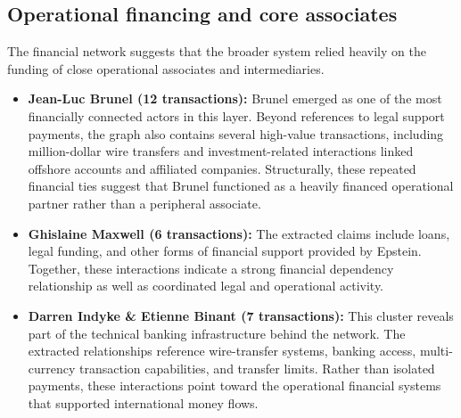 \subsection{Operational financing and core associates}
The financial network suggests that the broader system relied heavily on the funding of close operational associates and intermediaries.
\begin{itemize}
    \item \textbf{Jean-Luc Brunel (12 transactions):} Brunel emerged as one of the most financially connected actors in this layer. Beyond references to legal support payments, the graph also contains several high-value transactions, including million-dollar wire transfers and investment-related interactions linked offshore accounts and affiliated companies. Structurally, these repeated financial ties suggest that Brunel functioned as a heavily financed operational partner rather than a peripheral associate.
    \item \textbf{Ghislaine Maxwell (6 transactions):} The extracted claims include loans, legal funding, and other forms of financial support provided by Epstein. Together, these interactions indicate a strong financial dependency relationship as well as coordinated legal and operational activity.
    \item \textbf{Darren Indyke \& Etienne Binant (7 transactions):} This cluster reveals part of the technical banking infrastructure behind the network. The extracted relationships reference wire-transfer systems, banking access, multi-currency transaction capabilities, and transfer limits. Rather than isolated payments, these interactions point toward the operational financial systems that supported international money flows.
\end{itemize}

